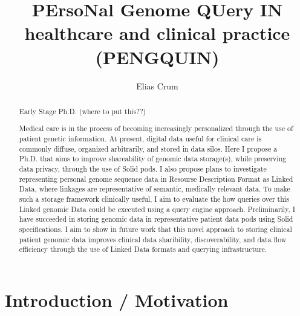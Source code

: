 \documentclass[runningheads]{llncs}
\begin{document}
\title{PErsoNal Genome QUery IN healthcare and clinical practice (PENGQUIN)}

\author{Elias Crum}



\maketitle

\begin{abstract}
	Early Stage Ph.D. (where to put this??)

	Medical care is in the process of becoming increasingly personalized through the use of patient genetic information. 
	At present, digital data useful for clinical care is commonly diffuse, organized arbitrarily, and stored in data silos. 
	Here I propose a Ph.D. that aims to improve shareability of genomic data storage(s), while preserving data privacy, through the use of Solid pods. 
	I also propose plans to investigate representing personal genome sequence data in Resourse Description Format as Linked Data, where linkages are representative of semantic, medically relevant data.
	To make such a storage framework clinically useful, I aim to evaluate the how queries over this Linked genomic Data could be executed using a query engine approach.
	Preliminarily, I have succeeded in storing genomic data in representative patient data pods using Solid specifications. 
	I aim to show in future work that this novel approach to storing clinical patient genomic data improves clinical data sharibility, discoverability, and data flow efficiency through the use of Linked Data formats and querying infrastructure. 


\end{abstract}


\section{Introduction / Motivation}

\end{document}
